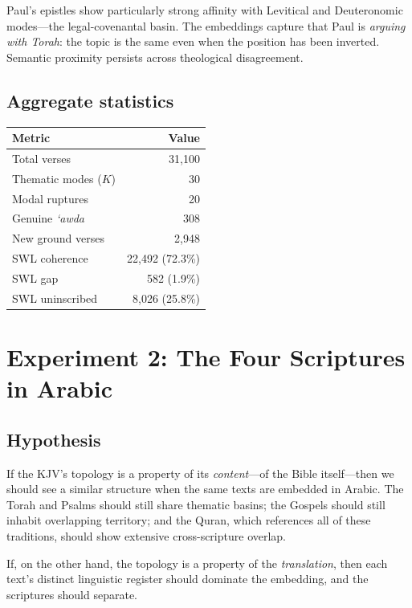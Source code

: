 \documentclass[11pt,a4paper]{article}
\theoremstyle{definition}
\begin{document}
Paul's epistles show particularly strong affinity with Levitical and Deuteronomic modes---the legal-covenantal basin. The embeddings capture that Paul is \emph{arguing with Torah}: the topic is the same even when the position has been inverted. Semantic proximity persists across theological disagreement.

\subsection{Aggregate statistics}

\begin{center}
\begin{tabular}{lr}
\toprule
\textbf{Metric} & \textbf{Value} \\
\midrule
Total verses & 31,100 \\
Thematic modes ($K$) & 30 \\
Modal ruptures & 20 \\
Genuine \emph{`awda} & 308 \\
New ground verses & 2,948 \\
SWL coherence & 22,492 (72.3\%) \\
SWL gap & 582 (1.9\%) \\
SWL uninscribed & 8,026 (25.8\%) \\
\bottomrule
\end{tabular}
\end{center}


\section{Experiment 2: The Four Scriptures in Arabic}

\subsection{Hypothesis}

If the KJV's topology is a property of its \emph{content}---of the Bible itself---then we should see a similar structure when the same texts are embedded in Arabic. The Torah and Psalms should still share thematic basins; the Gospels should still inhabit overlapping territory; and the Quran, which references all of these traditions, should show extensive cross-scripture overlap.

If, on the other hand, the topology is a property of the \emph{translation}, then each text's distinct linguistic register should dominate the embedding, and the scriptures should separate.
\end{document}
